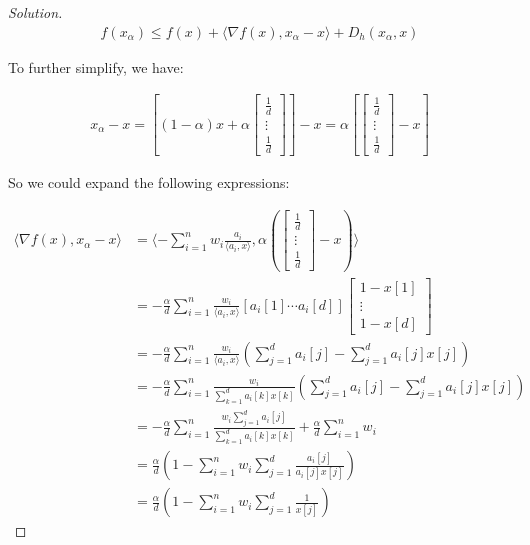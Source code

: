 \documentclass{article}
\newenvironment{solution}
  {\renewcommand\qedsymbol{$\blacksquare$}\begin{proof}[Solution]}
  {\end{proof}}
\begin{document}
\begin{solution}
\begin{align*}
    f(x_\alpha) \leq f(x) + \langle \nabla f(x), x_\alpha - x \rangle + D_h(x_\alpha, x)
\end{align*}

To further simplify, we have:

\begin{align*}
    x_\alpha - x 
    = \left[ (1 - \alpha) x + \alpha 
    \begin{bmatrix}
        \frac{1}{d} \\
        \vdots \\
        \frac{1}{d}
    \end{bmatrix}
    \right] - x = \alpha \left[ \begin{bmatrix}
    \frac{1}{d} \\
    \vdots \\
    \frac{1}{d} \end{bmatrix} - x \right]
\end{align*}

So we could expand the following expressions:

\begin{align*}
    \langle \nabla f(x), x_\alpha - x \rangle
    &= \langle -\sum_{i=1}^n w_i \frac{a_i}{\langle a_i, x \rangle}, \alpha \left( \begin{bmatrix}
    \frac{1}{d} \\
    \vdots \\
    \frac{1}{d} \end{bmatrix} - x \right) \rangle \\
    &= - \frac{\alpha}{d} \sum_{i = 1}^n \frac{w_i}{\langle a_i, x \rangle} 
        \left[a_i[1] \cdots a_i[d]\right]
        \begin{bmatrix}
        1 - x[1] \\
        \vdots \\
        1 - x[d]
        \end{bmatrix} \\
    &= - \frac{\alpha}{d} \sum_{i = 1}^n \frac{w_i}{\langle a_i, x \rangle} \left( \sum_{j = 1}^d a_i[j] - \sum_{j = 1}^d a_i[j] x[j] \right) \\
    &= - \frac{\alpha}{d} \sum_{i = 1}^n \frac{w_i}{\sum_{k = 1}^d a_i[k] x[k]} \left( \sum_{j = 1}^d a_i[j] - \sum_{j = 1}^d a_i[j] x[j] \right) \\
    &= - \frac{\alpha}{d} \sum_{i = 1}^n \frac{w_i \sum_{j = 1}^d a_i[j]}{\sum_{k = 1}^d a_i[k] x[k]} + \frac{\alpha}{d} \sum_{i = 1}^n w_i \\
    &= \frac{\alpha}{d} \left( 1 - \sum_{i = 1}^n w_i \sum_{j = 1}^d \frac{a_i[j]}{a_i[j] x[j]} \right) \\
    &= \frac{\alpha}{d} \left( 1 - \sum_{i = 1}^n w_i \sum_{j = 1}^d \frac{1}{x[j]} \right)
    \tag{1}
\end{align*}


\end{solution}
\end{document}
